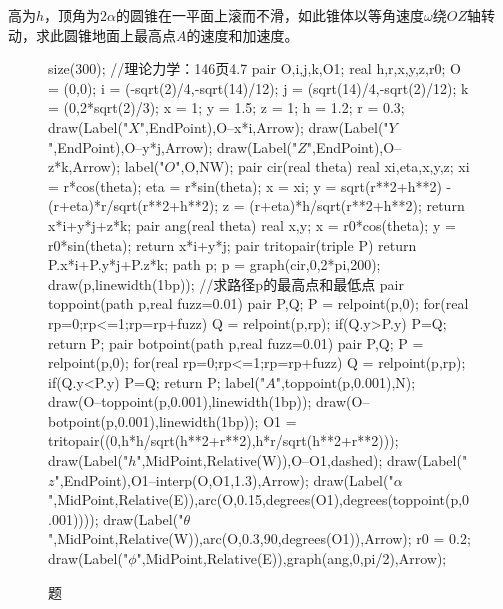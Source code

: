 \begin{question}
高为$h$，顶角为$2\alpha$的圆锥在一平面上滚而不滑，如此锥体以等角速度$\omega$绕$OZ$轴转动，求此圆锥地面上最高点$A$的速度和加速度。
\begin{figure}[htb]
\centering
\begin{asy}
	size(300);
	//理论力学：146页4.7
	pair O,i,j,k,O1;
	real h,r,x,y,z,r0;
	O = (0,0);
	i = (-sqrt(2)/4,-sqrt(14)/12);
	j = (sqrt(14)/4,-sqrt(2)/12);
	k = (0,2*sqrt(2)/3);
	x = 1;
	y = 1.5;
	z = 1;
	h = 1.2;
	r = 0.3;
	draw(Label("$X$",EndPoint),O--x*i,Arrow);
	draw(Label("$Y$",EndPoint),O--y*j,Arrow);
	draw(Label("$Z$",EndPoint),O--z*k,Arrow);
	label("$O$",O,NW);
	pair cir(real theta){
		real xi,eta,x,y,z;
		xi = r*cos(theta);
		eta = r*sin(theta);
		x = xi;
		y = sqrt(r**2+h**2) - (r+eta)*r/sqrt(r**2+h**2);
		z = (r+eta)*h/sqrt(r**2+h**2);
		return x*i+y*j+z*k;
	}
	pair ang(real theta){
		real x,y;
		x = r0*cos(theta);
		y = r0*sin(theta);
		return x*i+y*j;
	}
	pair tritopair(triple P){
		return P.x*i+P.y*j+P.z*k;
	}
	path p;
	p = graph(cir,0,2*pi,200);
	draw(p,linewidth(1bp));
	//求路径p的最高点和最低点
	pair toppoint(path p,real fuzz=0.01){
		pair P,Q;
		P = relpoint(p,0);
		for(real rp=0;rp<=1;rp=rp+fuzz){
			Q = relpoint(p,rp);
			if(Q.y>P.y) P=Q;
		}
		return P;
	}
	pair botpoint(path p,real fuzz=0.01){
		pair P,Q;
		P = relpoint(p,0);
		for(real rp=0;rp<=1;rp=rp+fuzz){
			Q = relpoint(p,rp);
			if(Q.y<P.y) P=Q;
		}
		return P;
	}
	label("$A$",toppoint(p,0.001),N);
	draw(O--toppoint(p,0.001),linewidth(1bp));
	draw(O--botpoint(p,0.001),linewidth(1bp));
	O1 = tritopair((0,h*h/sqrt(h**2+r**2),h*r/sqrt(h**2+r**2)));
	draw(Label("$h$",MidPoint,Relative(W)),O--O1,dashed);
	draw(Label("$z$",EndPoint),O1--interp(O,O1,1.3),Arrow);
	draw(Label("$\alpha$",MidPoint,Relative(E)),arc(O,0.15,degrees(O1),degrees(toppoint(p,0.001))));
	draw(Label("$\theta$",MidPoint,Relative(W)),arc(O,0.3,90,degrees(O1)),Arrow);
	r0 = 0.2;
	draw(Label("$\phi$",MidPoint,Relative(E)),graph(ang,0,pi/2),Arrow);
	\end{asy}
\caption{题\thequestion}
\label{理论力学：146页4.7}
\end{figure}
\end{question}

